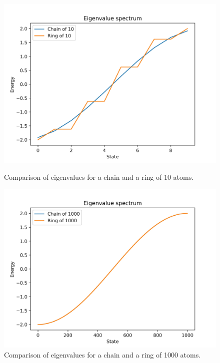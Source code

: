 \documentclass{article}
\begin{document}
\begin{figure}[ht]
    \centering
    \begin{minipage}{0.47\textwidth}
        \centering
        \includegraphics[width=\textwidth]{Figures/chain_vs_ring.jpg}
        \caption{Comparison of eigenvalues for a chain and a ring of 10 atoms.}
        \label{fig:chain_ring}
    \end{minipage}
    \hfill
    \begin{minipage}{0.47\textwidth}
        \centering
        \includegraphics[width=\textwidth]{Figures/convergence_limit.jpg}
        \caption{Comparison of eigenvalues for a chain and a ring of 1000 atoms.}
        \label{fig:chain_vs_ring_infinite}
    \end{minipage}
\end{figure}
\end{document}
